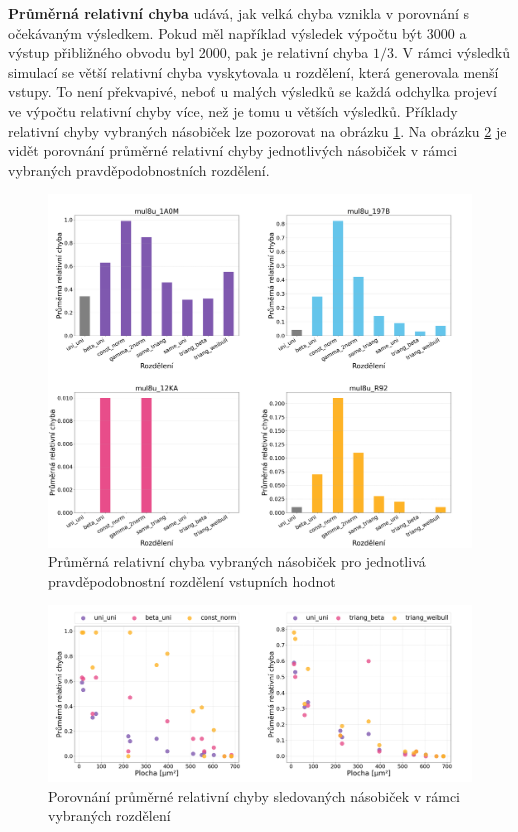 \textbf{Průměrná relativní chyba} udává, jak velká chyba vznikla v porovnání s očekávaným výsledkem. Pokud měl například výsledek výpočtu být 3000 a výstup přibližného obvodu byl 2000, pak je relativní chyba $1/3$. 
V rámci výsledků simulací se větší relativní chyba vyskytovala u rozdělení, která generovala menší vstupy. To není překvapivé, neboť u malých výsledků se každá odchylka projeví ve výpočtu relativní chyby více, než je tomu u větších výsledků. Příklady relativní chyby vybraných násobiček lze pozorovat na obrázku \ref{fig:metrics_mean_relative_error}. Na obrázku \ref{fig:scatter_mean_relative_error} je vidět porovnání průměrné relativní chyby jednotlivých násobiček v rámci vybraných pravděpodobnostních rozdělení.

\begin{figure}[H]
    \centering
    \includegraphics[width=\textwidth]{obrazky-figures/metrics_mean_relative_error.png}
    \caption{Průměrná relativní chyba vybraných násobiček pro jednotlivá pravděpodobnostní rozdělení vstupních hodnot}
    \label{fig:metrics_mean_relative_error}
\end{figure}

\begin{figure}[H]
    \centering
    \includegraphics[width=\textwidth]{obrazky-figures/scatter_mean_relative_error.png}
    \caption{Porovnání průměrné relativní chyby sledovaných násobiček v rámci vybraných rozdělení}
    \label{fig:scatter_mean_relative_error}
\end{figure}

